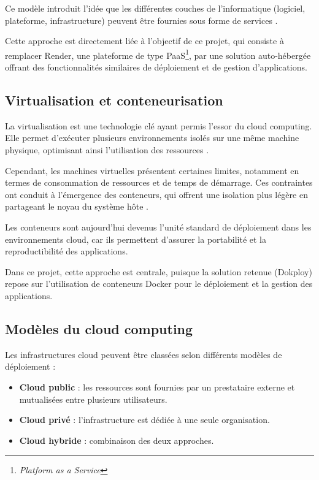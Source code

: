 \documentclass{rapportClass} %
\begin{document}
Ce modèle introduit l'idée que les différentes couches de
l'informatique (logiciel, plateforme, infrastructure) peuvent être
fournies sous forme de services \cite{NIST2026}.

Cette approche est directement liée à l'objectif de ce projet, qui
consiste à remplacer Render, une plateforme de type PaaS\footnote{\textit{Platform as a Service}}, par une
solution auto-hébergée offrant des fonctionnalités similaires de
déploiement et de gestion d'applications.

\subsection{Virtualisation et conteneurisation}

La virtualisation est une technologie clé ayant permis
l'essor du cloud computing. Elle permet d'exécuter plusieurs
environnements isolés sur une même machine physique, optimisant ainsi
l'utilisation des ressources \cite{VMware2007}.

Cependant, les machines virtuelles présentent certaines limites,
notamment en termes de consommation de ressources et de temps de
démarrage. Ces contraintes ont conduit à l'émergence des conteneurs,
qui offrent une isolation plus légère en partageant le noyau du
système hôte \cite{Merkel2014}.

Les conteneurs sont aujourd'hui devenus l'unité standard de déploiement
dans les environnements cloud, car ils permettent d'assurer la
portabilité et la reproductibilité des applications.

Dans ce projet, cette approche est centrale, puisque la solution
retenue (Dokploy) repose sur l'utilisation de conteneurs Docker pour
le déploiement et la gestion des applications.


\subsection{Modèles du cloud computing}

Les infrastructures cloud peuvent être classées selon différents
modèles de déploiement :

\begin{itemize}
\item \textbf{Cloud public} : les ressources sont fournies par un
prestataire externe et mutualisées entre plusieurs utilisateurs.
\item \textbf{Cloud privé} : l'infrastructure est dédiée à une seule
organisation.
\item \textbf{Cloud hybride} : combinaison des deux approches.
\end{itemize}
\end{document}
